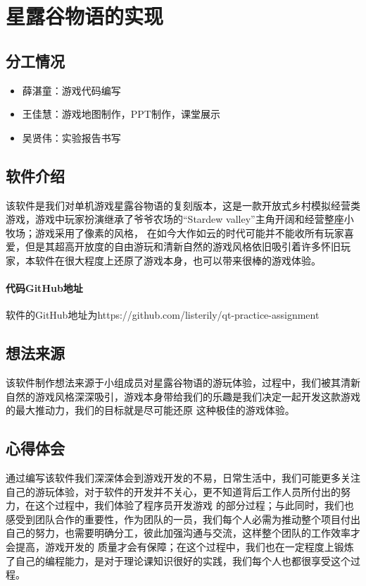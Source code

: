 \documentclass[a4paper,12pt]{report}
\begin{document}
\chapter*{星露谷物语的实现}
\setcounter{page}{1}
\begin{spacing}{1.5}
\songti{}

\section{分工情况}
 \begin{itemize}
 	\item 薛湛童：游戏代码编写
 	\item 王佳慧：游戏地图制作，PPT制作，课堂展示
 	\item 吴贤伟：实验报告书写
 \end{itemize}
\section{软件介绍}
该软件是我们对单机游戏星露谷物语的复刻版本，这是一款开放式乡村模拟经营类游戏，游戏中玩家扮演继承了爷爷农场的“Stardew valley”主角开阔和经营整座小牧场；游戏采用了像素的风格，
在如今大作如云的时代可能并不能收所有玩家喜爱，但是其超高开放度的自由游玩和清新自然的游戏风格依旧吸引着许多怀旧玩家，本软件在很大程度上还原了游戏本身，也可以带来很棒的游戏体验。
\subsubsection{代码GitHub地址}
软件的GitHub地址为https://github.com/listerily/qt-practice-assignment
\section{想法来源}
该软件制作想法来源于小组成员对星露谷物语的游玩体验，过程中，我们被其清新自然的游戏风格深深吸引，游戏本身带给我们的乐趣是我们决定一起开发这款游戏的最大推动力，我们的目标就是尽可能还原
这种极佳的游戏体验。

\section{心得体会}
通过编写该软件我们深深体会到游戏开发的不易，日常生活中，我们可能更多关注自己的游玩体验，对于软件的开发并不关心，更不知道背后工作人员所付出的努力，在这个过程中，我们体验了程序员开发游戏
的部分过程；与此同时，我们也感受到团队合作的重要性，作为团队的一员，我们每个人必需为推动整个项目付出自己的努力，也需要明确分工，彼此加强沟通与交流，这样整个团队的工作效率才会提高，游戏开发的
质量才会有保障；在这个过程中，我们也在一定程度上锻炼了自己的编程能力，是对于理论课知识很好的实践，我们每个人也都很享受这个过程。
\end{spacing}
\end{document}

